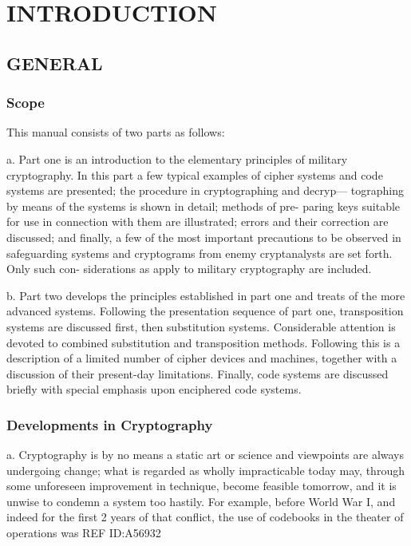 
\chapter{INTRODUCTION}
 
\section{GENERAL}

\subsection{Scope}

This manual consists of two parts as follows:

a. Part one is an introduction to the elementary principles of military
cryptography. In this part a few typical examples of cipher systems and
code systems are presented; the procedure in cryptographing and decryp—
tographing by means of the systems is shown in detail; methods of pre-
paring keys suitable for use in connection with them are illustrated;
errors and their correction are discussed; and ﬁnally, a few of the most
important precautions to be observed in safeguarding systems and
cryptograms from enemy cryptanalysts are set forth. Only such con-
siderations as apply to military cryptography are included.

b. Part two develops the principles established in part one and treats
of the more advanced systems. Following the presentation sequence of
part one, transposition systems are discussed ﬁrst, then substitution
systems. Considerable attention is devoted to combined substitution and
transposition methods. Following this is a description of a limited number
of cipher devices and machines, together with a discussion of their
present-day limitations. Finally, code systems are discussed brieﬂy with
special emphasis upon enciphered code systems.

\subsection{Developments in Cryptography}

a. Cryptography is by no means a static art or science and viewpoints
are always undergoing change; what is regarded as wholly impracticable
today may, through some unforeseen improvement in technique, become
feasible tomorrow, and it is unwise to condemn a system too hastily.
For example, before World War I, and indeed for the ﬁrst 2 years of
that conﬂict, the use of codebooks in the theater of operations was
REF ID:A56932

